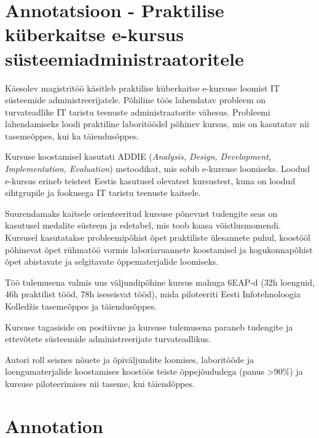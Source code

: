 \clearpage
\chapter*{Annotatsioon - Praktilise küberkaitse e-kursus
süsteemiadministraatoritele}
\label{annotatsioon}
\thispagestyle{empty}
Käesolev magistritöö käsitleb praktilise küberkaitse e-kursuse loomist IT süsteemide administreerijatele. Põhiline töös lahendatav probleem on turvateadlike IT taristu teenuste administraatorite vähesus. Probleemi lahendamiseks loodi praktiline laboritöödel põhinev kursus, mis on kasutatav nii tasemeõppes, kui ka täiendusõppes.

Kursuse koostamisel kasutati \gls{ADDIE} (\emph{Analysis, Design, Development, Implementation, Evaluation}) metoodikat, mis sobib e-kursuse loomiseks. Loodud e-kursus erineb teistest Eestis kasutusel olevatest kursustest, kuna on loodud sihtgrupile ja fookusega IT taristu teenuste kaitsele.

Suurendamaks kaitsele orienteeritud kursuse põnevust tudengite seas on kasutusel medalite süsteem ja edetabel, mis toob kaasa võistlusmomendi. Kursusel kasutatakse probleemipõhist õpet praktiliste ülesannete puhul, koostööl põhinevat õpet rühmatöö vormis laboriaruannete  koostamisel ja kogukonnapõhist õpet abistavate ja selgitavate õppematerjalide loomiseks.

Töö tulemusena valmis uus väljundipõhine kursus mahuga 6EAP-d (32h loenguid, 46h praktilist tööd, 78h iseseisvat tööd), mida piloteeriti Eesti Infotehnoloogia Kolledžis tasemeõppes ja täiendusõppes. %

Kursuse tagasiside on positiivne ja kursuse tulemusena paraneb tudengite ja ettevõtete süsteemide administreerijate turvateadlikus.

Autori roll seisnes nõuete ja õpiväljundite loomises, laboritööde ja loengumaterjalide koostamises koostöös teiste õppejõududega (panus >90\%) ja kursuse piloteerimises nii taseme, kui täiendõppes.

\clearpage
\chapter*{Annotation}
\label{annotation}
\thispagestyle{empty}

